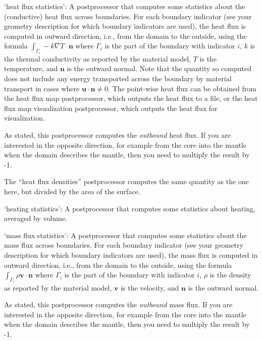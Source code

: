 \begin{itemize}
`heat flux statistics': A postprocessor that computes some statistics about the (conductive) heat flux across boundaries. For each boundary indicator (see your geometry description for which boundary indicators are used), the heat flux is computed in outward direction, i.e., from the domain to the outside, using the formula $\int_{\Gamma_i} -k \nabla T \cdot \mathbf n$ where $\Gamma_i$ is the part of the boundary with indicator $i$, $k$ is the thermal conductivity as reported by the material model, $T$ is the temperature, and $\mathbf n$ is the outward normal. Note that the quantity so computed does not include any energy transported across the boundary by material transport in cases where $\mathbf u \cdot \mathbf n \neq 0$. The point-wise heat flux can be obtained from the heat flux map postprocessor, which outputs the heat flux to a file, or the heat flux map visualization postprocessor, which outputs the heat flux for visualization. 

As stated, this postprocessor computes the \textit{outbound} heat flux. If you are interested in the opposite direction, for example from the core into the mantle when the domain describes the mantle, then you need to multiply the result by -1.


The ``heat flux densities'' postprocessor computes the same quantity as the one here, but divided by the area of the surface.

`heating statistics': A postprocessor that computes some statistics about heating, averaged by volume. 

`mass flux statistics': A postprocessor that computes some statistics about the mass flux across boundaries. For each boundary indicator (see your geometry description for which boundary indicators are used), the mass flux is computed in outward direction, i.e., from the domain to the outside, using the formula $\int_{\Gamma_i} \rho \mathbf v \cdot \mathbf n$ where $\Gamma_i$ is the part of the boundary with indicator $i$, $\rho$ is the density as reported by the material model, $\mathbf v$ is the velocity, and $\mathbf n$ is the outward normal. 

As stated, this postprocessor computes the \textit{outbound} mass flux. If you are interested in the opposite direction, for example from the core into the mantle when the domain describes the mantle, then you need to multiply the result by -1.


\end{itemize}
